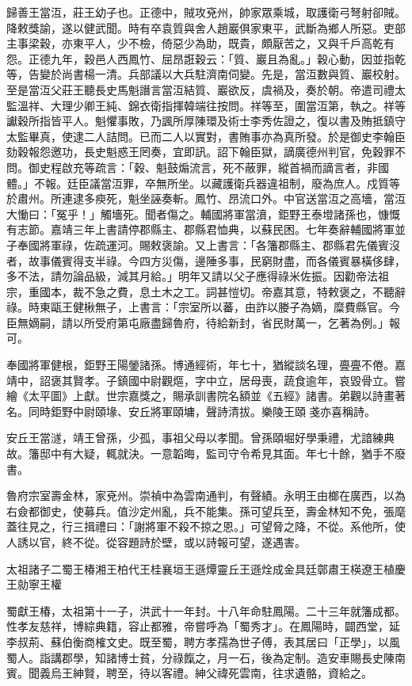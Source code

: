 歸善王當沍，莊王幼子也。正德中，賊攻兗州，帥家眾乘城，取護衛弓弩射卻賊。降敕獎諭，遂以健武聞。時有卒袁質與舍人趙巖俱家東平，武斷為鄉人所惡。吏部主事梁穀，亦東平人，少不檢，倚惡少為助，既貴，頗厭苦之，又與千戶高乾有怨。正德九年，穀邑人西鳳竹、屈昂誑穀云：「質、巖且為亂。」穀心動，因並指乾等，告變於尚書楊一清。兵部議以大兵駐濟南伺變。先是，當沍數與質、巖校射。至是當沍父莊王聽長史馬魁譖言當沍結質、巖欲反，虞禍及，奏於朝。帝遣司禮太監溫祥、大理少卿王純、錦衣衛指揮韓端往按問。祥等至，圍當沍第，執之。祥等讞穀所指皆平人。魁懼事敗，乃諷所厚陳環及術士李秀佐證之，復以書及賄抵鎮守太監畢真，使逮二人詰問。已而二人以實對，書賄事亦為真所發。於是御史李翰臣劾穀報怨邀功，長史魁惑王罔奏，宜即訊。詔下翰臣獄，謫廣德州判官，免穀罪不問。御史程啟充等疏言：「穀、魁鼓煽流言，死不蔽罪，縱首禍而謫言者，非國體。」不報。廷臣議當沍罪，卒無所坐。以藏護衛兵器違祖制，廢為庶人。戍質等於肅州。所連逮多瘐死，魁坐誣奏斬。鳳竹、昂流口外。中官送當沍之高墻，當沍大慟曰：「冤乎！」觸墻死。聞者傷之。輔國將軍當濆，鉅野王泰墱諸孫也，慷慨有志節。嘉靖三年上書請停郡縣主、郡縣君恤典，以蘇民困。七年奏辭輔國將軍並子奉國將軍祿，佐疏運河。賜敕褒諭。又上書言：「各籓郡縣主、郡縣君先儀賓沒者，故事儀賓得支半祿。今四方災傷，邊陲多事，民窮財盡，而各儀賓暴橫侈肆，多不法，請勿論品級，減其月給。」明年又請以父子應得祿米佐振。因勸帝法祖宗，重國本，裁不急之費，息土木之工。詞甚愷切。帝嘉其意，特敕褒之，不聽辭祿。時東甌王健楸無子，上書言：「宗室所以蕃，由詐以媵子為嫡，糜費縣官。今臣無嫡嗣，請以所受府第屯廠盡歸魯府，待給新封，省民財萬一，乞著為例。」報可。

奉國將軍健根，鉅野王陽鎣諸孫。博通經術，年七十，猶縱談名理，亹亹不倦。嘉靖中，詔褒其賢孝。子鎮國中尉觀熰，字中立，居母喪，蔬食逾年，哀毀骨立。嘗繪《太平圖》上獻。世宗嘉獎之，賜承訓書院名額並《五經》諸書。弟觀以詩畫著名。同時鉅野中尉頤堟、安丘將軍頤墉，聲詩清拔。樂陵王頤戔亦喜稱詩。

安丘王當澻，靖王曾孫，少孤，事祖父母以孝聞。曾孫頤堀好學秉禮，尤諳練典故。籓邸中有大疑，輒就決。一意韜晦，監司守令希見其面。年七十餘，猶手不廢書。

魯府宗室壽金林，家兗州。崇禎中為雲南通判，有聲績。永明王由榔在廣西，以為右僉都御史，使募兵。值沙定州亂，兵不能集。孫可望兵至，壽金林知不免，張麾蓋往見之，行三揖禮曰：「謝將軍不殺不掠之恩。」可望脅之降，不從。系他所，使人誘以官，終不從。從容題詩於壁，或以詩報可望，遂遇害。


太祖諸子二蜀王椿湘王柏代王桂襄垣王遜燂靈丘王遜烇成金具廷鄣肅王楧遼王植慶王勍寧王權

蜀獻王椿，太祖第十一子，洪武十一年封。十八年命駐鳳陽。二十三年就籓成都。性孝友慈祥，博綜典籍，容止都雅，帝嘗呼為「蜀秀才」。在鳳陽時，闢西堂，延李叔荊、蘇伯衡商榷文史。既至蜀，聘方孝孺為世子傅，表其居曰「正學」，以風蜀人。詣講郡學，知諸博士貧，分祿餼之，月一石，後為定制。造安車賜長史陳南賓。聞義烏王紳賢，聘至，待以客禮。紳父禕死雲南，往求遺骼，資給之。

